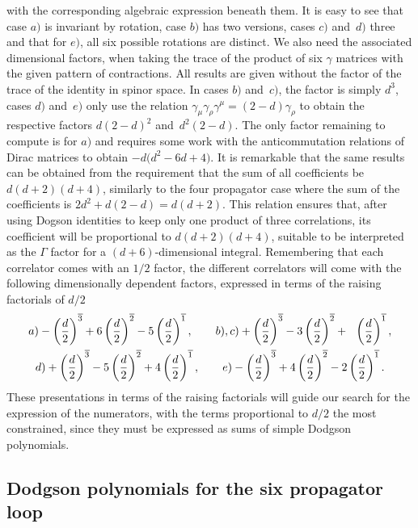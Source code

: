 \documentclass[pdftex]{sigma}
\numberwithin{equation}{section}
\begin{document}
with the corresponding algebraic expression beneath them.
It is easy to see that case $a)$ is invariant by rotation, case $b)$ has two versions, cases $c)$
and~$d)$ three and that for $e)$, all six possible rotations are distinct. We also need the associated
dimensional factors, when taking the trace of the product of six $\gamma$ matrices with the given pattern of
contractions. All results are given without the factor of the trace of the identity in spinor space.
In cases $b)$ and~$c)$, the factor is simply $d^3$, cases $d)$ and~$e)$
only use the relation $\gamma_\mu \gamma_\rho \gamma^\mu = (2-d) \gamma_\rho$ to obtain the respective factors
$d(2-d)^2$ and~$d^2(2-d)$. The only factor remaining to compute is for $a)$ and requires some work with
the anticommutation relations of Dirac matrices to obtain $-d\bigl(d^2-6d+4\bigr)$. It is remarkable that the
same results can be obtained from the requirement that the sum of all coefficients be $d(d+2)(d+4)$, similarly
to the four propagator case where the sum of the coefficients is $2 d^2 + d(2-d) = d(d+2)$. This relation
ensures that, after using Dogson identities to keep only one product of three correlations, its coefficient will
be proportional to $d(d+2)(d+4)$, suitable to be interpreted as the $\Gamma$ factor for a $(d+6)$-dimensional
integral. Remembering that each correlator comes with an $1/2$ factor, the different correlators will come
with the following dimensionally dependent factors, expressed in terms of the raising factorials of $d/2$
\begin{gather*}
	 a) - \left(\frac d 2 \right)^{\overline 3} + 6 \left(\frac d 2 \right)^{\overline 2}
		- 5 \left(\frac d 2 \right)^{\overline 1} ,\qquad
	 b),c) + \left(\frac d 2 \right)^{\overline 3} - 3 \left(\frac d 2 \right)^{\overline 2}
		+ \hphantom{1} \left(\frac d 2 \right)^{\overline 1} ,\\
	 d) + \left(\frac d 2 \right)^{\overline 3} - 5 \left(\frac d 2 \right)^{\overline 2}
		+ 4 \left(\frac d 2 \right)^{\overline 1} ,\qquad
	 e) - \left(\frac d 2 \right)^{\overline 3} + 4 \left(\frac d 2 \right)^{\overline 2}
		- 2 \left(\frac d 2 \right)^{\overline 1}.
\end{gather*}
These presentations in terms of the raising factorials will guide our search for the expression of the
numerators, with the terms proportional to $d/2$ the most constrained, since they must be expressed as sums of
simple Dodgson polynomials.

\subsection{Dodgson polynomials for the six propagator loop}
\end{document}
